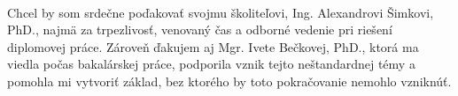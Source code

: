 \newpage
\pagestyle{plain}
~

\vfill
{} Chcel by som srdečne poďakovať svojmu školiteľovi, Ing. Alexandrovi Šimkovi, PhD., najmä za trpezlivosť, venovaný čas a odborné vedenie pri riešení diplomovej práce. Zároveň ďakujem aj Mgr. Ivete Bečkovej, PhD., ktorá ma viedla počas bakalárskej práce, podporila vznik tejto neštandardnej témy a pomohla mi vytvoriť základ, bez ktorého by toto pokračovanie nemohlo vzniknúť.
